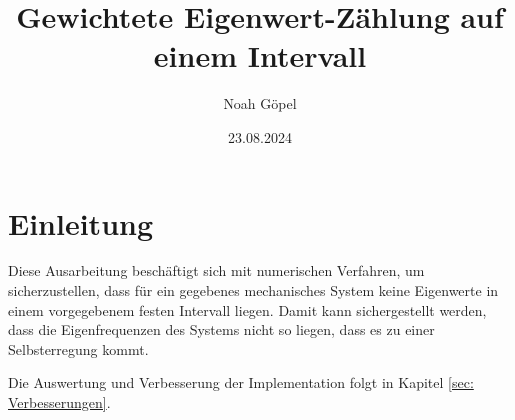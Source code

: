 \documentclass[ngerman,BCOR=4mm]{tudscrreprt}
\theoremstyle{plain} %
\theoremstyle{definition} %
\theoremstyle{remark}
\begin{document}

\date{23.08.2024}
\title{%
      Gewichtete Eigenwert-Zählung auf einem Intervall
}
\subject{bachelor}
\author{%
      Noah Göpel%
}
\maketitle

\clearpage
\tableofcontents
\clearpage
\listofsymbols
\clearpage

\chapter{Einleitung}
\label{sec: Einleitung}
      
      Diese Ausarbeitung beschäftigt sich mit numerischen Verfahren, um sicherzustellen, dass für ein gegebenes mechanisches System keine Eigenwerte in einem vorgegebenem festen Intervall liegen.
      Damit kann sichergestellt werden, dass die Eigenfrequenzen des Systems nicht so liegen, dass es zu einer Selbsterregung kommt.



      Die Auswertung und Verbesserung der Implementation folgt in Kapitel \ref{sec: Verbesserungen}.

\end{document}
